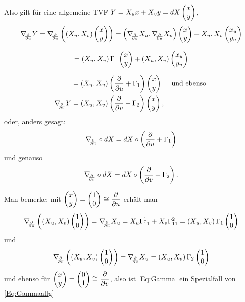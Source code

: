 	Also gilt für eine allgemeine TVF $ Y=X_ux+X_vy=dX\begin{pmatrix} x \\ y \end{pmatrix} $, 
		\[ \nabla_{\!\!{\partial\over \partial u}}Y= \nabla_{\!\!{\partial\over \partial u}}\left ( \left( X_u,X_v \right) \pmat{x \\y}    \right ) = \left( \nabla_{\!\!{\partial\over \partial u}}X_u,\nabla_{\!\!{\partial\over \partial u}}X_v \right) \pmat{x \\y} + X_u,X_v \pmat{x_u \\ y_u} \]

		\[ = \left( X_u, X_v \right) \Gamma_1\begin{pmatrix} x \\ y \end{pmatrix} + \left( X_u, X_v \right) \begin{pmatrix} x_u \\ y_u \end{pmatrix} \] 
		
		\begin{equation} \label{Eq:Gammaallg}
		\begin{split}
			&= \left( X_u, X_v \right) \left( \dfrac{\partial}{\partial u} +\Gamma_1 \right) \begin{pmatrix} x \\ y \end{pmatrix}  \quad \text{ und ebenso }
		 \\ 
		 \nabla_{\!\!{\partial\over \partial v}}Y &= \left( X_u, X_v \right) \left( \dfrac{\partial}{\partial v} +\Gamma_2 \right) \begin{pmatrix} x \\ y \end{pmatrix}, 
		 \end{split}
		\end{equation} 
	oder, anders gesagt:
		\[ \nabla_{\!\!{\partial\over \partial u}} \circ dX = dX \circ \left( \dfrac{\partial}{\partial u} + \Gamma_1 \right)  \]
	und genauso
		\[  \nabla_{\!\!{\partial\over \partial v}} \circ dX = dX \circ \left( \dfrac{\partial}{\partial v} + \Gamma_2 \right).   \]	
	
	Man bemerke: mit $ \begin{pmatrix} x \\ y \end{pmatrix} = \begin{pmatrix} 1 \\ 0 \end{pmatrix} \cong \dfrac{\partial}{\partial u} $ erhält man
		\[ \nabla_{\!\!{\partial\over \partial u}}\left( \left( X_u,X_v \right) \begin{pmatrix} 1 \\ 0 \end{pmatrix} \right) = \nabla_{\!\!{\partial\over \partial u}}X_u = X_u \Gamma_{11}^1 + X_v\Gamma_{11}^2 = \left( X_u,X_v \right) \Gamma_1\begin{pmatrix} 1 \\ 0 \end{pmatrix}   \] 
	und
		\[ \nabla_{\!\!{\partial\over \partial v}} \left( \left( X_u,X_v \right) \begin{pmatrix} 1 \\ 0 \end{pmatrix} \right) = \nabla_{\!\!{\partial\over \partial v}}X_u = \left( X_u,X_v \right) \Gamma_2\begin{pmatrix} 1 \\ 0 \end{pmatrix} \]
	und ebenso für  $ \begin{pmatrix} x \\ y \end{pmatrix} = \begin{pmatrix} 0 \\ 1 \end{pmatrix} \cong \dfrac{\partial}{\partial v} $, also ist \ref*{Eq:Gamma} ein Spezialfall von \ref*{Eq:Gammaallg}
	
